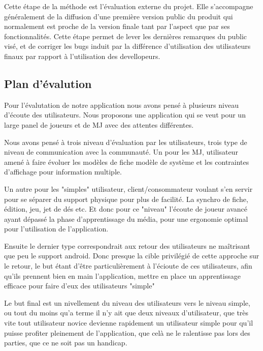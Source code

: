 \documentclass[11pt,a4paper]{article}
\begin{document}
Cette étape de la méthode est l'évaluation externe du projet. Elle s'accompagne
généralement de la diffusion d'une première version public du produit qui
normalement est proche de la version finale tant par l'aspect que par ses
fonctionnalités.
Cette étape permet de lever les dernières remarques du public visé, et de
corriger les bugs induit par la différence d'utilisation des utilisateurs finaux
par rapport à l'utilisation des devellopeurs.


\subsection{Plan d'évalution}

Pour l'évalutation de notre application nous avons pensé à plusieurs niveau d'écoute
des utilisateurs. Nous proposons une application qui se veut pour un large panel 
de joueurs et de MJ avec des attentes différentes.

Nous avons pensé à trois niveau d'évaluation par les utilisateurs, trois type de niveau de communication
 avec la communauté. Un pour les MJ, utilisateur amené à faire évoluer les modèles de fiche modèle de système
et les contraintes d'affichage pour information multiple.

Un autre pour les "simples" utilisateur, client/consommateur voulant s'en servir pour se séparer
du support physique pour plus de facilité. La synchro de fiche, édition, jeu, jet de dés etc.
Et donc pour ce "niveau" l'écoute de joueur avancé ayant dépassé la phase d'apprentissage 
du média, pour une ergonomie optimal pour l'utilisation de l'application. 

Ensuite le dernier type correspondrait aux retour des utilisateurs ne maîtrisant que peu le support
android. Donc presque la cible privilégié de cette approche sur le retour, le but étant d'être particulièrement
à l'écioute de ces utilisateurs, afin qu'ils prennent bien en main l'application, mettre en place un apprentissage
efficace pour faire d'eux des utilisateurs "simple" 

Le but final est un nivellement du niveau des utilisateurs vers le niveau simple, ou tout du moins 
qu'a terme il n'y ait que deux niveaux d'utilisateur, que très vite tout utilisateur novice devienne rapidement
un utilisateur simple pour qu'il puisse profiter pleinement de l'application, que celà ne le ralentisse pas lors 
des parties, que ce ne soit pas un handicap.
\end{document}
